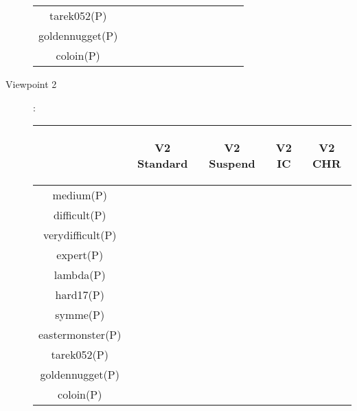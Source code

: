 \begin{description}
\begin{center}
\begin{tabular}{|c|c|c|c|c|c|c|c|c|c|c|c|}
tarek052(P)             & & & & & & & & & & & \\
goldennugget(P)         & & & & & & & & & & & \\
coloin(P)               & & & & & & & & & & & \\
\hline
\end{tabular}
\end{center}
 \item[Viewpoint 2]:
\begin{center}
\footnotesize
\begin{tabular}{|c|c|c|c|c|}
\hline
& \begin{sideways}V2 Standard\end{sideways} & \begin{sideways}V2 Suspend\end{sideways} & \begin{sideways}V2 IC\end{sideways} 
& \begin{sideways}V2 CHR\end{sideways}\\
\hline
\hline                     
medium(P)               & & & & \\
difficult(P)            & & & & \\
verydifficult(P)        & & & & \\
expert(P)               & & & & \\
lambda(P)               & & & & \\
hard17(P)               & & & & \\
symme(P)                & & & & \\
eastermonster(P)        & & & & \\
tarek052(P)             & & & & \\
goldennugget(P)         & & & & \\
coloin(P)               & & & & \\
\hline
\end{tabular}
\end{center}
\end{description}